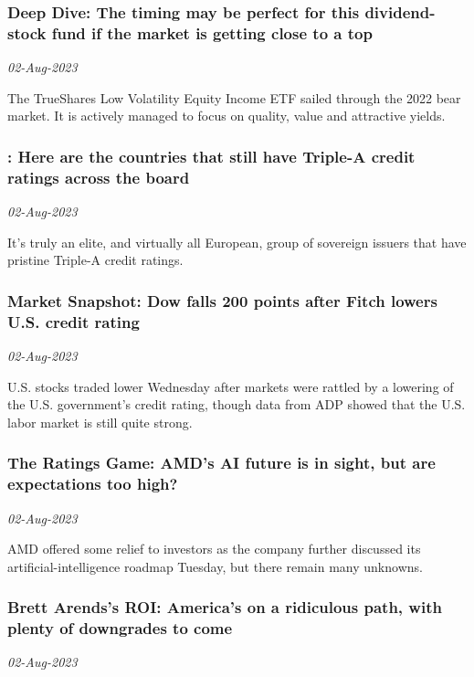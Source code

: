 \subsubsection{Deep Dive: The timing may be perfect for this dividend-stock fund if the market is getting close to a top \href{http://www.marketwatch.com/news/story.asp?guid=%7B20C06575-04D4-B545-723E-8D76A96B097A%7D&siteid=rss&rss=1}{}}
\textit{02-Aug-2023}

The TrueShares Low Volatility Equity Income ETF sailed through the 2022 bear market. It is actively managed to focus on quality, value and attractive yields.
\subsubsection{: Here are the countries that still have Triple-A credit ratings across the board \href{http://www.marketwatch.com/news/story.asp?guid=%7B20C06575-04D4-B545-723E-B99189ED3375%7D&siteid=rss&rss=1}{\ding{225}}}
\textit{02-Aug-2023}

It's truly an elite, and virtually all European, group of sovereign issuers that have pristine Triple-A credit ratings.
\subsubsection{Market Snapshot: Dow falls 200 points after  Fitch lowers U.S. credit rating \href{http://www.marketwatch.com/news/story.asp?guid=%7B20C06575-04D4-B545-723E-6E5353E841B3%7D&siteid=rss&rss=1}{\ding{225}}}
\textit{02-Aug-2023}

U.S. stocks traded lower Wednesday after markets were rattled by a lowering of the U.S. government's credit rating, though data from ADP showed that the U.S. labor market is still quite strong.
\subsubsection{The Ratings Game: AMD’s AI future is in sight, but are expectations too high? \href{http://www.marketwatch.com/news/story.asp?guid=%7B20C06575-04D4-B545-723E-87D369B64D2E%7D&siteid=rss&rss=1}{\ding{225}}}
\textit{02-Aug-2023}

AMD offered some relief to investors as the company further discussed its artificial-intelligence roadmap Tuesday, but there remain many unknowns.
\subsubsection{Brett Arends's ROI: America’s on a ridiculous path, with plenty of downgrades to come \href{http://www.marketwatch.com/news/story.asp?guid=%7B20C06575-04D4-B545-723E-B48B8BD5275E%7D&siteid=rss&rss=1}{}}
\textit{02-Aug-2023}

